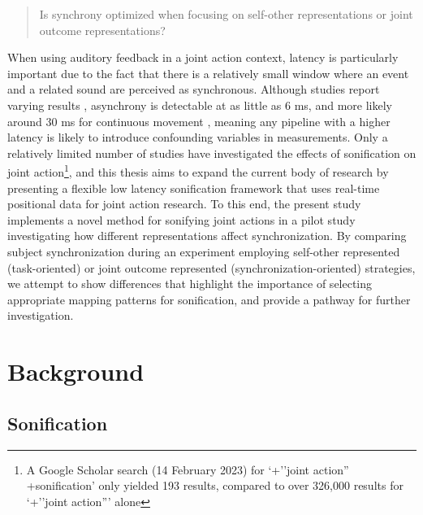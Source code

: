 \documentclass[10pt,a4paper,onecolumn]{article}
\begin{document}
\begin{quote}
Is synchrony optimized when focusing on self-other representations or joint outcome representations?
\end{quote}

When using auditory feedback in a joint action context, latency is particularly important due to the fact that there is a relatively small window where an event and a related sound are perceived as synchronous. Although studies report varying results \autocite{keetels2012perception}, asynchrony is detectable at as little as 6 ms, and more likely around 30 ms for continuous movement \autocite{mcphersonActionSoundLatencyAre2016}, meaning any pipeline with a higher latency is likely to introduce confounding variables in measurements. Only a relatively limited number of studies have investigated the effects of sonification on joint action\footnote{A Google Scholar search (14 February 2023) for `+''joint action'' +sonification' only yielded 193 results, compared to over 326,000 results for `+''joint action''' alone}, and this thesis aims to expand the current body of research by presenting a flexible low latency sonification framework that uses real-time positional data for joint action research. To this end, the present study implements a novel method for sonifying joint actions in a pilot study investigating how different representations affect synchronization. By comparing subject synchronization during an experiment employing self-other represented (task-oriented) or joint outcome represented (synchronization-oriented) strategies, we attempt to show differences that highlight the importance of selecting appropriate mapping patterns for sonification, and provide a pathway for further investigation.

\hypertarget{background}{%
\section{Background}\label{background}}

\hypertarget{sonification}{%
\subsection{Sonification}\label{sonification}}
\end{document}
